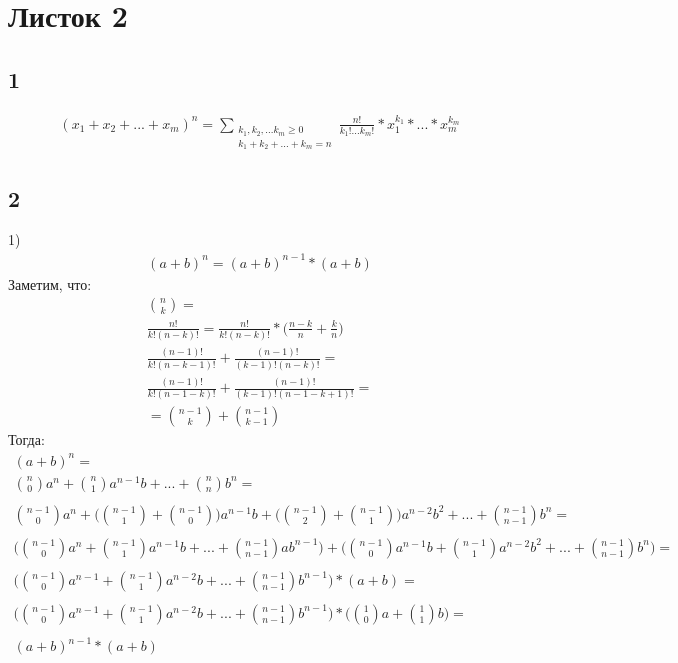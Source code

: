 \newpage	
	\section{Листок 2}
		
		\subsection{1}
		\begin{gather*}
		(x_1 + x_2 + ... + x_m)^n = \sum_{\substack{k_1, k_2, ... k_m \geqslant 0 \\ k_1 + k_2 + ... + k_m = n}}^{} \frac{n!}{k_1! ... k_m!} * x_1^{k_1} * ... * x_m^{k_m}
		\end{gather*}
		
		\subsection{2}
		1)\\
		\begin{gather*}
		(a + b)^{n} = (a + b)^{n-1} * (a + b) 
		\end{gather*}
		Заметим, что:
		\begin{gather*}
		{n \choose k} = \\
		\frac{n!}{k!(n-k)!} = \frac{n!}{k!(n-k)!} * \biggl( \frac{n-k}{n} + \frac{k}{n} \biggl)\\
		\frac{(n-1)!}{k!(n-k-1)!} + \frac{(n-1)!}{(k-1)!(n-k)!} = \\
		\frac{(n-1)!}{k!(n-1-k)!} + \frac{(n-1)!}{(k-1)!(n-1-k+1)!} = \\
		 = {{n-1} \choose {k}} + {{n-1} \choose {k-1}}
		\end{gather*}
		Тогда:
		\begin{gather*}
		(a + b)^{n} = \\
		{n \choose 0}a^{n} + {n \choose 1}a^{n-1}b + ... + {n \choose n}b^{n} =	\\ \\
		{n-1 \choose 0}a^{n} + \biggl({n-1 \choose 1} + {n-1 \choose 0}\biggl)a^{n-1}b + 
		\biggl({n-1 \choose 2} + {n-1 \choose 1}\biggl)a^{n-2}b^2 + ... + {n-1 \choose n-1}b^{n} = \\ \\
		\biggl({n-1 \choose 0}a^{n} + {n-1 \choose 1}a^{n-1}b + ... + {n-1 \choose n-1}ab^{n-1}\biggl) + 
		\biggl({n-1 \choose 0}a^{n-1}b + {n-1 \choose 1}a^{n-2}b^{2} + ... + {n-1 \choose n-1}b^{n}\biggl) = \\ \\
		\biggl({n-1 \choose 0}a^{n-1} + {n-1 \choose 1}a^{n-2}b + ... + {n-1 \choose n-1}b^{n-1}\biggl) * 
		(a + b) = \\ \\
		\biggl({n-1 \choose 0}a^{n-1} + {n-1 \choose 1}a^{n-2}b + ... + {n-1 \choose n-1}b^{n-1}\biggl) * 
		\biggl({1 \choose 0}a + {1 \choose 1}b\biggl) = \\ \\
		(a + b)^{n-1} * (a + b) 
		\end{gather*}
